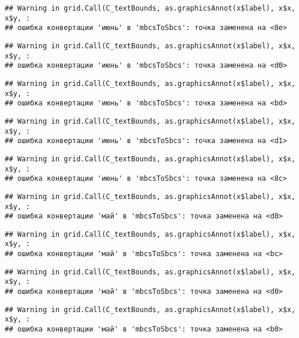 \documentclass[
]{article}
\begin{document}
\begin{verbatim}
## Warning in grid.Call(C_textBounds, as.graphicsAnnot(x$label), x$x, x$y, :
## ошибка конвертации 'июнь' в 'mbcsToSbcs': точка заменена на <8e>
\end{verbatim}

\begin{verbatim}
## Warning in grid.Call(C_textBounds, as.graphicsAnnot(x$label), x$x, x$y, :
## ошибка конвертации 'июнь' в 'mbcsToSbcs': точка заменена на <d0>
\end{verbatim}

\begin{verbatim}
## Warning in grid.Call(C_textBounds, as.graphicsAnnot(x$label), x$x, x$y, :
## ошибка конвертации 'июнь' в 'mbcsToSbcs': точка заменена на <bd>
\end{verbatim}

\begin{verbatim}
## Warning in grid.Call(C_textBounds, as.graphicsAnnot(x$label), x$x, x$y, :
## ошибка конвертации 'июнь' в 'mbcsToSbcs': точка заменена на <d1>
\end{verbatim}

\begin{verbatim}
## Warning in grid.Call(C_textBounds, as.graphicsAnnot(x$label), x$x, x$y, :
## ошибка конвертации 'июнь' в 'mbcsToSbcs': точка заменена на <8c>
\end{verbatim}

\begin{verbatim}
## Warning in grid.Call(C_textBounds, as.graphicsAnnot(x$label), x$x, x$y, :
## ошибка конвертации 'май' в 'mbcsToSbcs': точка заменена на <d0>
\end{verbatim}

\begin{verbatim}
## Warning in grid.Call(C_textBounds, as.graphicsAnnot(x$label), x$x, x$y, :
## ошибка конвертации 'май' в 'mbcsToSbcs': точка заменена на <bc>
\end{verbatim}

\begin{verbatim}
## Warning in grid.Call(C_textBounds, as.graphicsAnnot(x$label), x$x, x$y, :
## ошибка конвертации 'май' в 'mbcsToSbcs': точка заменена на <d0>
\end{verbatim}

\begin{verbatim}
## Warning in grid.Call(C_textBounds, as.graphicsAnnot(x$label), x$x, x$y, :
## ошибка конвертации 'май' в 'mbcsToSbcs': точка заменена на <b0>
\end{verbatim}
\end{document}
